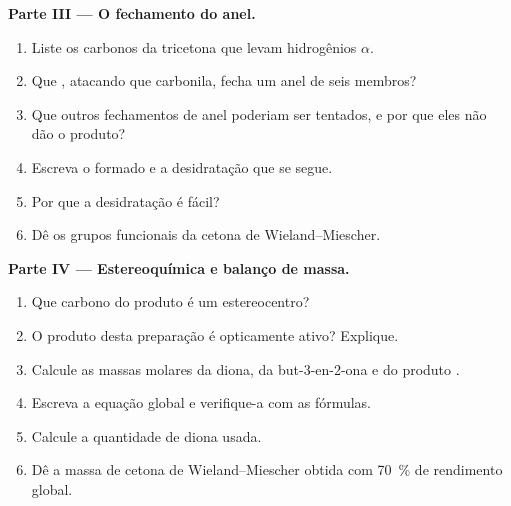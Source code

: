 \begin{problem}
\medskip
\noindent\textbf{Parte III --- O fechamento do anel.}
\begin{enumerate}[resume]
  \item Liste os carbonos da tricetona que levam hidrogênios $\alpha$.
  \item Que , atacando que carbonila, fecha um anel de seis membros?
  \item Que outros fechamentos de anel poderiam ser tentados, e por que eles não dão o produto?
  \item Escreva o  formado e a desidratação que se segue.
  \item Por que a desidratação é fácil?
  \item Dê os grupos funcionais da cetona de Wieland--Miescher.
\end{enumerate}

\medskip
\noindent\textbf{Parte IV --- Estereoquímica e balanço de massa.}
\begin{enumerate}[resume]
  \item Que carbono do produto é um estereocentro?
  \item O produto desta preparação é opticamente ativo? Explique.
  \item Calcule as massas molares da diona, da but-3-en-2-ona e do produto
        .
  \item Escreva a equação global e verifique-a com as fórmulas.
  \item Calcule a quantidade de diona usada.
  \item Dê a massa de cetona de Wieland--Miescher obtida com 70~\% de rendimento global.
\end{enumerate}
\end{problem}
